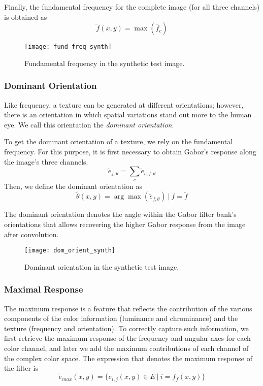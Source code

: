 Finally, the fundamental frequency for the complete image (for all three channels) is obtained as
\begin{equation}
	\widetilde{f}(x,y) =  \max(\widetilde{f_c})  \label{eq:fundamental_freq}
\end{equation}

\begin{figure}[!ht]
	\texttt{[image: fund\_freq\_synth]}
    \caption{Fundamental frequency in the synthetic test image.}
    \label{fig:fund_freq_synth}
\end{figure}

\subsubsection{Dominant Orientation}
Like frequency, a texture can be generated at different orientations; however, there is an orientation in which spatial variations stand out more to the human eye. We call this orientation the \textit{dominant orientation}.

To get the dominant orientation of a texture, we rely on the fundamental frequency. For this purpose, it is first necessary to obtain Gabor's response along the image's three channels.
\begin{equation}
	\widetilde{e}_{f, \theta} = \underset{c}{\sum} \widetilde{e}_{c, f, \theta}  \label{eq:gabor_energy_freq_orient}
\end{equation}
Then, we define the dominant orientation as 
\begin{equation}
	\widetilde{\theta}(x,y) =  \arg\max (\widetilde{e}_{f, \theta}) ~|~ f = \widetilde{f} \label{eq:dominant_orient}
\end{equation}

The dominant orientation denotes the angle within the Gabor filter bank's orientations that allows recovering the higher Gabor response from the image after convolution.

\begin{figure}[!ht]
	\texttt{[image: dom\_orient\_synth]}
    \caption{Dominant orientation in the synthetic test image.}
    \label{fig:dom_orient_synth}
\end{figure}

\subsubsection{Maximal Response}
 The maximum response is a feature that reflects the contribution of the various components of the color information (luminance and chrominance) and the texture (frequency and orientation). To correctly capture such information, we first retrieve the maximum response of the frequency and angular axes for each color channel, and later we add the maximum contributions of each channel of the complex color space. The expression that denotes the maximum response of the filter is
\begin{equation}
	\widetilde{e}_{max}(x,y) = \lbrace e_{i,j}(x,y) \in E ~|~ i = f_{f}(x,y) \rbrace \label{eq:max_energy}
\end{equation}

